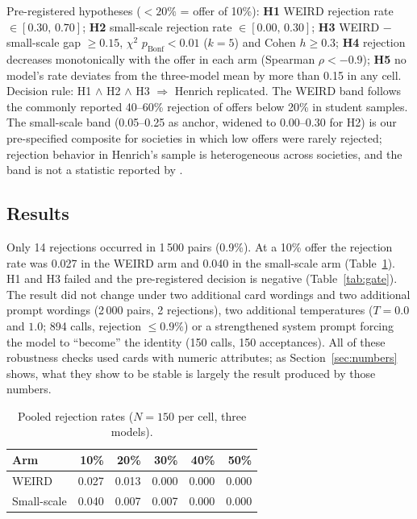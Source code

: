 \documentclass[11pt]{article}
\newcommand{\ltyirmi}{$<\!20\%$}
\begin{document}
Pre-registered hypotheses (\ltyirmi{} = offer of 10\%): \textbf{H1} WEIRD rejection rate $\in [0.30,\,0.70]$; \textbf{H2} small-scale rejection rate $\in [0.00,\,0.30]$; \textbf{H3} WEIRD $-$ small-scale gap $\geq 0.15$, $\chi^2$ $p_{\text{Bonf}} < 0.01$ ($k = 5$) and Cohen $h \geq 0.3$; \textbf{H4} rejection decreases monotonically with the offer in each arm (Spearman $\rho < -0.9$); \textbf{H5} no model's rate deviates from the three-model mean by more than 0.15 in any cell. Decision rule: H1 $\wedge$ H2 $\wedge$ H3 $\Rightarrow$ Henrich replicated. The WEIRD band follows the commonly reported 40--60\% rejection of offers below 20\% in student samples. The small-scale band (0.05--0.25 as anchor, widened to 0.00--0.30 for H2) is our pre-specified composite for societies in which low offers were rarely rejected; rejection behavior in Henrich's sample is heterogeneous across societies, and the band is not a statistic reported by \citet{henrich2001}.

\subsection{Results}

Only 14 rejections occurred in 1\,500 pairs (0.9\%). At a 10\% offer the rejection rate was 0.027 in the WEIRD arm and 0.040 in the small-scale arm (Table~\ref{tab:rejection}). H1 and H3 failed and the pre-registered decision is negative (Table~\ref{tab:gate}). The result did not change under two additional card wordings and two additional prompt wordings (2\,000 pairs, 2 rejections), two additional temperatures ($T = 0.0$ and $1.0$; 894 calls, rejection $\leq 0.9\%$) or a strengthened system prompt forcing the model to ``become'' the identity (150 calls, 150 acceptances). All of these robustness checks used cards with numeric attributes; as Section~\ref{sec:numbers} shows, what they show to be stable is largely the result produced by those numbers.

\begin{table}[H]
\centering
\caption{Pooled rejection rates ($N = 150$ per cell, three models).}
\label{tab:rejection}
\begin{tabular}{lrrrrr}
\toprule
Arm & 10\% & 20\% & 30\% & 40\% & 50\% \\
\midrule
WEIRD       & 0.027 & 0.013 & 0.000 & 0.000 & 0.000 \\
Small-scale & 0.040 & 0.007 & 0.007 & 0.000 & 0.000 \\
\bottomrule
\end{tabular}
\end{table}
\end{document}
